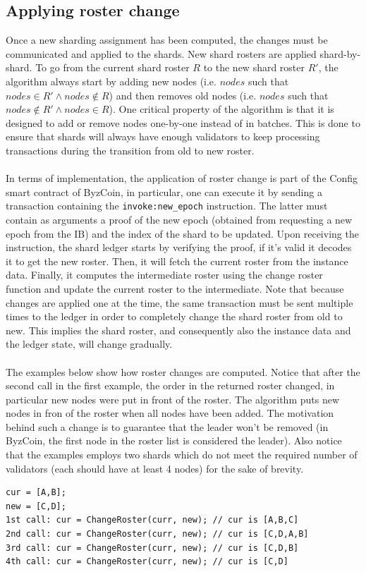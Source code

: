 \subsection{Applying roster change} \label{apply-roster-change}
Once a new sharding assignment has been computed, the changes must be communicated and applied to the shards. New shard rosters are applied shard-by-shard. To go from the current shard roster $R$ to the new shard roster $R'$, the algorithm always start by adding new nodes (i.e. $nodes$ such that $nodes \in R' \land  nodes \notin R$) and then removes old nodes (i.e. $nodes$ such that $nodes \notin R' \land nodes \in R$). One critical property of the algorithm is that it is designed to add or remove nodes one-by-one instead of in batches. This is done to ensure that shards will always have enough validators to keep processing transactions during the transition from old to new roster. \\\\
In terms of implementation, the application of roster change is part of the Config smart contract of ByzCoin, in particular, one can execute it by sending a transaction containing the \texttt{invoke:new\_epoch} instruction. The latter must contain as arguments a proof of the new epoch (obtained from requesting a new epoch from the IB) and the index of the shard to be updated. Upon receiving the instruction, the shard ledger starts by verifying the proof, if it's valid it decodes it to get the new roster. Then, it will fetch the current roster from the instance data. Finally, it computes the intermediate roster using the change roster function and update the current roster to the intermediate. Note that because changes are applied one at the time, the same transaction must be sent multiple times to the ledger in order to completely change the shard roster from old to new.  This implies the shard roster, and consequently also the instance data and the ledger state, will change gradually. \\\\
The examples below show how roster changes are computed. Notice that after the second call in the first example, the order in the returned roster changed, in particular new nodes were put in front of the roster. The algorithm puts new nodes in fron of the roster when all nodes have been added. The motivation behind such a change is to guarantee that the leader won't be removed (in ByzCoin, the first node in the roster list is considered the leader). Also notice that the examples employs two shards which do not meet the required number of validators (each should have at least 4 nodes) for the sake of brevity.
\begin{lstlisting}[basicstyle=\ttfamily\footnotesize]
cur = [A,B]; 
new = [C,D];
1st call: cur = ChangeRoster(curr, new); // cur is [A,B,C]
2nd call: cur = ChangeRoster(curr, new); // cur is [C,D,A,B]
3rd call: cur = ChangeRoster(curr, new); // cur is [C,D,B]
4th call: cur = ChangeRoster(curr, new); // cur is [C,D]
\end{lstlisting}

